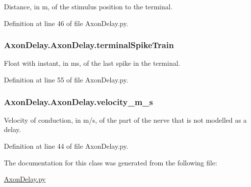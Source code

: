 Distance, in m, of the stimulus position to the terminal. 



Definition at line 46 of file Axon\-Delay.\-py.

\hypertarget{class_axon_delay_1_1_axon_delay_aba392d8938766355063cf4bf3a87962d}{
\subsubsection[{terminal\-Spike\-Train}]{\setlength{\rightskip}{0pt plus 5cm}Axon\-Delay.\-Axon\-Delay.\-terminal\-Spike\-Train}}\label{class_axon_delay_1_1_axon_delay_aba392d8938766355063cf4bf3a87962d}


Float with instant, in ms, of the last spike in the terminal. 



Definition at line 55 of file Axon\-Delay.\-py.

\hypertarget{class_axon_delay_1_1_axon_delay_a59cc448f95b38b88b7103c3058e8c397}{
\subsubsection[{velocity\-\_\-m\-\_\-s}]{\setlength{\rightskip}{0pt plus 5cm}Axon\-Delay.\-Axon\-Delay.\-velocity\-\_\-m\-\_\-s}}\label{class_axon_delay_1_1_axon_delay_a59cc448f95b38b88b7103c3058e8c397}


Velocity of conduction, in m/s, of the part of the nerve that is not modelled as a delay. 



Definition at line 44 of file Axon\-Delay.\-py.



The documentation for this class was generated from the following file\-:\begin{DoxyCompactItemize}
\item 
\hyperlink{_axon_delay_8py}{Axon\-Delay.\-py}\end{DoxyCompactItemize}
